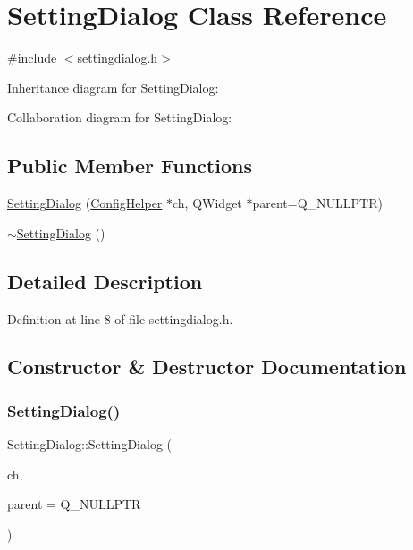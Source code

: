 \hypertarget{class_setting_dialog}{}\section{Setting\+Dialog Class Reference}
\label{class_setting_dialog}


{\ttfamily \#include $<$settingdialog.\+h$>$}



Inheritance diagram for Setting\+Dialog\+:


Collaboration diagram for Setting\+Dialog\+:
\subsection*{Public Member Functions}
\begin{DoxyCompactItemize}
\item 
\mbox{\hyperlink{class_setting_dialog_af322e721867c2b24feb25cd2c2ba3ff5}{Setting\+Dialog}} (\mbox{\hyperlink{class_config_helper}{Config\+Helper}} $\ast$ch, Q\+Widget $\ast$parent=Q\+\_\+\+N\+U\+L\+L\+P\+TR)
\item 
\mbox{\hyperlink{class_setting_dialog_a9bfa278550d23df3f5e944989b0b0f54}{$\sim$\+Setting\+Dialog}} ()
\end{DoxyCompactItemize}


\subsection{Detailed Description}


Definition at line 8 of file settingdialog.\+h.



\subsection{Constructor \& Destructor Documentation}
\mbox{\label{class_setting_dialog_af322e721867c2b24feb25cd2c2ba3ff5}} 
\subsubsection{\texorpdfstring{Setting\+Dialog()}{SettingDialog()}}
{\footnotesize\ttfamily Setting\+Dialog\+::\+Setting\+Dialog (\begin{DoxyParamCaption}\item[{\mbox{\hyperlink{class_config_helper}{Config\+Helper}} $\ast$}]{ch,  }\item[{Q\+Widget $\ast$}]{parent = {\ttfamily Q\+\_\+NULLPTR} }\end{DoxyParamCaption})}



